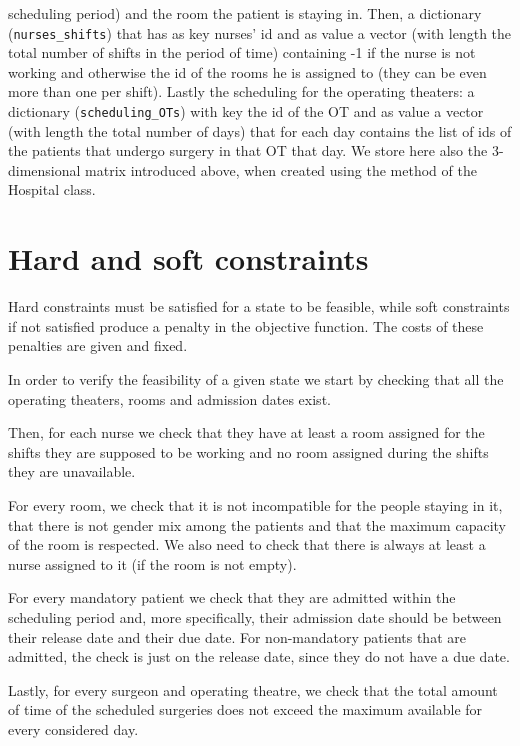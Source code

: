 \documentclass{article}
\begin{document}
\begin{itemize}
    scheduling period) and the room the patient is staying in.
    Then, a dictionary (\texttt{nurses\_shifts}) that has as key nurses' id and as value a vector (with length the total number of shifts in the 
    period of time) containing -1 if the nurse is not working and otherwise the id of the rooms he is assigned to (they can be even more than one per shift). 
    Lastly the scheduling for the operating theaters: a dictionary (\texttt{scheduling\_OTs}) with key the id of the OT and as value a vector (with length the total number 
    of days) that for each day contains the list of ids of the patients that undergo surgery in that OT that day.
    We store here also the 3-dimensional matrix introduced above, when created using the method of the Hospital class.
\end{itemize}


\section{Hard and soft constraints}
Hard constraints must be satisfied for a state to be feasible, while soft constraints if not satisfied produce a penalty in the 
objective function. The costs of these penalties are given and fixed.

In order to verify the feasibility of a given state we start by checking that all the operating theaters, rooms and admission dates exist.

Then, for each nurse we check that they have at least a room assigned for the shifts they are supposed to be working and no room assigned during 
the shifts they are unavailable.

For every room, we check that it is not incompatible for the people staying in it, that there is not gender mix among the patients and 
that the maximum capacity of the room is respected. We also need to check that there is always at least a nurse assigned to it (if the room is not empty).

For every mandatory patient we check that they are admitted within the scheduling period and, more specifically, their admission date
should be between their release date and their due date. For non-mandatory patients that are admitted, the check is just on the release date,
since they do not have a due date.

Lastly, for every surgeon and operating theatre, we check that the total amount of time of the scheduled
surgeries does not exceed the maximum available for every considered day.
\end{document}
